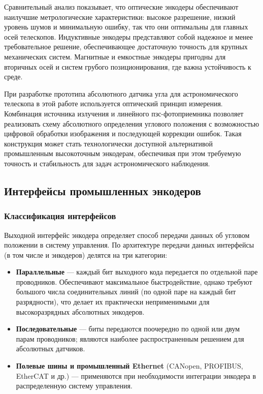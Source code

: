 Сравнительный анализ показывает, что оптические энкодеры обеспечивают наилучшие метрологические характеристики: высокое разрешение, низкий уровень шумов и минимальную ошибку, так что они оптимальны для главных осей телескопов. Индуктивные энкодеры представляют собой надежное и менее требовательное решение, обеспечивающее достаточную точность для крупных механических систем. Магнитные и емкостные энкодеры пригодны для вторичных осей и систем грубого позиционирования, где важна устойчивость к среде.

При разработке прототипа абсолютного датчика угла для астрономического телескопа в этой работе используется оптический принцип измерения. Комбинация источника излучения и линейного пзс-фотоприемника позволяет реализовать схему абсолютного определения углового положения с возможностью цифровой обработки изображения и последующей коррекции ошибок. Такая конструкция может стать технологически доступной альтернативой промышленным высокоточным энкодерам, обеспечивая при этом требуемую точность и стабильность для задач астрономического наблюдения. 

\subsection{Интерфейсы промышленных энкодеров}

\subsubsection{Классификация интерфейсов}

Выходной интерфейс энкодера определяет способ передачи данных об угловом положении в систему управления. По архитектуре передачи данных интерфейсы (в том числе и энкодеров) делятся на три категории:
\begin{itemize}
\item \textbf{Параллельные} --- каждый бит выходного кода передается по отдельной паре проводников. Обеспечивают максимальное быстродействие, однако требуют большого числа соединительных линий (по одной паре на каждый бит разрядности), что делает их практически неприменимыми для высокоразрядных абсолютных энкодеров.

\item \textbf{Последовательные} --- биты передаются поочередно по одной или двум парам проводников; являются наиболее распространенным решением для абсолютных датчиков.

\item \textbf{Полевые шины и промышленный Ethernet} (CANopen, PROFIBUS, EtherCAT и др.) --- применяются при необходимости интеграции энкодера в распределенную систему управления.
\end{itemize}

